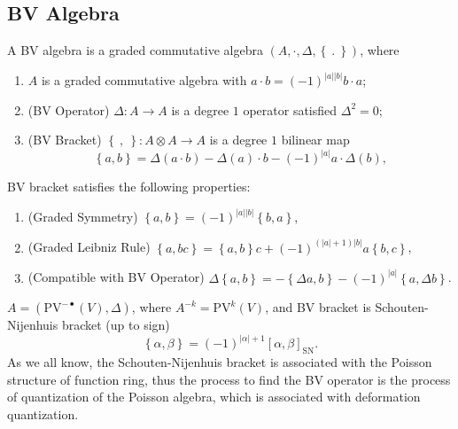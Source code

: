 \documentclass[10pt]{article}
\begin{document}
\subsection{BV Algebra}

\begin{definition}[BV Algebra]
  A BV algebra is a graded commutative algebra $ (A, \cdot, \Delta, \left\{ ~.~ \right\})$, where
  \begin{enumerate}[(1)]
    \item $ A$ is a graded commutative algebra with $ a \cdot b = (-1)^{\left| a \right|\left| b \right|} b \cdot a$;
    \item (BV Operator) $ \Delta : A \rightarrow A$ is a degree $ 1 $ operator satisfied $ \Delta^{2} = 0$;
    \item (BV Bracket) $\left\{ ~,~ \right\} : A \otimes A \rightarrow A$ is a degree $ 1$ bilinear map
      \begin{equation*}
        \left\{ a, b \right\} = \Delta(a \cdot b) - \Delta(a) \cdot b - (-1)^{\left| a \right|} a \cdot \Delta(b),
      \end{equation*}
  \end{enumerate}
\end{definition}
\begin{proposition}
  BV bracket satisfies the following properties:
  \begin{enumerate}[(1)]
    \item (Graded Symmetry) $\left\{ a,b \right\} = (-1)^{\left| a \right|\left| b \right|} \left\{ b, a \right\}$,
    \item (Graded Leibniz Rule) $\left\{ a, bc \right\} = \left\{ a, b \right\} c + (-1)^{(\left| a \right|+1)\left| b \right|} a \left\{ b,c \right\}$,
    \item (Compatible with BV Operator) $ \Delta\left\{ a,b \right\} = - \left\{ \Delta a, b \right\} - (-1)^{\left| a \right|} \left\{ a, \Delta b \right\}$.
  \end{enumerate}
\end{proposition}
\begin{example}
  $ A = \left( \mathrm{PV}^{-\bullet}(V), \Delta \right)$, where $ A^{-k} = \mathrm{PV}^{k}(V)$, and BV bracket is Schouten-Nijenhuis bracket (up to sign)
  \begin{equation*}
    \left\{ \alpha, \beta \right\} = (-1)^{\left| \alpha \right|+1} [\alpha, \beta]_{\mathrm{SN}}.
  \end{equation*}
  As we all know, the Schouten-Nijenhuis bracket is associated with the Poisson structure of function ring, thus the process to find the BV operator is the process of quantization of the Poisson algebra, which is associated with deformation quantization.
\end{example}
\end{document}
